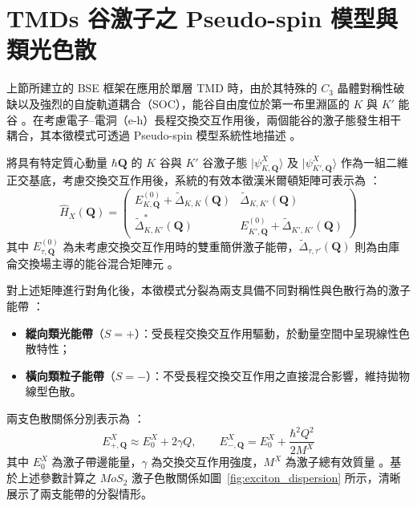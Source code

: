 \section{TMDs 谷激子之 Pseudo-spin 模型與類光色散}
\label{sec:theory_pseudospin}

上節所建立的 BSE 框架在應用於單層 TMD 時，由於其特殊的 $C_3$ 晶體對稱性破缺以及強烈的自旋軌道耦合（SOC），能谷自由度位於第一布里淵區的 $K$ 與 $K'$ 能谷 \cite{xiao2012}。在考慮電子--電洞（e-h）長程交換交互作用後，兩個能谷的激子態發生相干耦合，其本徵模式可透過 Pseudo-spin 模型系統性地描述 \cite{Lin2024Phd}。

將具有特定質心動量 $\hbar \mathbf{Q}$ 的 $K$ 谷與 $K'$ 谷激子態 $|\psi^X_{K,\mathbf{Q}}\rangle$ 及 $|\psi^X_{K',\mathbf{Q}}\rangle$ 作為一組二維正交基底，考慮交換交互作用後，系統的有效本徵漢米爾頓矩陣可表示為 \cite{Lin2024Phd,Yu2014}：
\begin{equation}
	\hat{H}_X(\mathbf{Q}) = \begin{pmatrix} E^{(0)}_{K,\mathbf{Q}} + \tilde{\Delta}_{K,K}(\mathbf{Q}) & \tilde{\Delta}_{K,K'}(\mathbf{Q}) \\ \tilde{\Delta}^*_{K,K'}(\mathbf{Q}) & E^{(0)}_{K',\mathbf{Q}} + \tilde{\Delta}_{K',K'}(\mathbf{Q}) \end{pmatrix}
	\label{eq:H_pseudospin}
\end{equation}
其中 $E^{(0)}_{\tau,\mathbf{Q}}$ 為未考慮交換交互作用時的雙重簡併激子能帶，$\tilde{\Delta}_{\tau,\tau'}(\mathbf{Q})$ 則為由庫侖交換場主導的能谷混合矩陣元 \cite{Lin2024Phd}。

對上述矩陣進行對角化後，本徵模式分裂為兩支具備不同對稱性與色散行為的激子能帶 \cite{Lin2024Phd,qiu2015}：
\begin{itemize}
	\item \textbf{縱向類光能帶}（$S = +$）：受長程交換交互作用驅動，於動量空間中呈現線性色散特性；
	\item \textbf{橫向類粒子能帶}（$S = -$）：不受長程交換交互作用之直接混合影響，維持拋物線型色散。
\end{itemize}
兩支色散關係分別表示為 \cite{Lin2024Phd}：
\begin{equation}
	E^X_{+,\mathbf{Q}} \approx E^X_0 + 2\gamma Q, \qquad E^X_{-,\mathbf{Q}} = E^X_0 + \frac{\hbar^2 Q^2}{2 M^X}
	\label{eq:exciton_dispersion}
\end{equation}
其中 $E^X_0$ 為激子帶邊能量，$\gamma$ 為交換交互作用強度，$M^X$ 為激子總有效質量 \cite{Lin2024Phd}。基於上述參數計算之 $MoS_2$ 激子色散關係如圖~\ref{fig:exciton_dispersion} 所示，清晰展示了兩支能帶的分裂情形。

